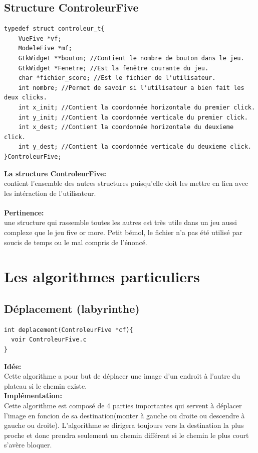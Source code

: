 \documentclass[a4paper, 11pt, oneside]{article}
\begin{document}
\newpage
\subsection{Structure ControleurFive}
\begin{lstlisting}[caption={Structure controleur}]
typedef struct controleur_t{
    VueFive *vf; 
    ModeleFive *mf; 
    GtkWidget **bouton; //Contient le nombre de bouton dans le jeu.
    GtkWidget *Fenetre; //Est la fenêtre courante du jeu.
    char *fichier_score; //Est le fichier de l'utilisateur.
    int nombre; //Permet de savoir si l'utilisateur a bien fait les deux clicks.
    int x_init; //Contient la coordonnée horizontale du premier click.
    int y_init; //Contient la coordonnée verticale du premier click.
    int x_dest; //Contient la coordonnée horizontale du deuxieme click.
    int y_dest; //Contient la coordonnée verticale du deuxieme click.
}ControleurFive;
\end{lstlisting}
\textbf{La structure ControleurFive:}\\
contient l'ensemble des autres structures puisqu'elle doit les mettre en lien avec les intéraction de l'utilisateur.\\ \\
\textbf{Pertinence:}\\
une structure qui rassemble toutes les autres est très utile dans un jeu aussi complexe que le jeu five or more. Petit bémol, le fichier n'a pas été utilisé par soucis de temps ou le mal compris de l'énoncé.
\newpage

\section{Les algorithmes particuliers}
\subsection{Déplacement (labyrinthe)}
\begin{lstlisting}
int deplacement(ControleurFive *cf){
  voir ControleurFive.c 
}

\end{lstlisting}
\textbf{Idée:}\\
Cette algorithme a pour but de déplacer une image d'un endroit à l'autre du plateau si le chemin existe.
\\
\textbf{Implémentation:}\\
Cette algorithme est composé de 4 parties importantes qui servent à déplacer l'image en foncion de sa destination(monter à gauche ou droite ou descendre à gauche ou droite). L'algorithme se dirigera toujours vers la destination la plus proche et donc prendra seulement un chemin différent si le chemin le plus court s'avère bloquer.
\end{document}
